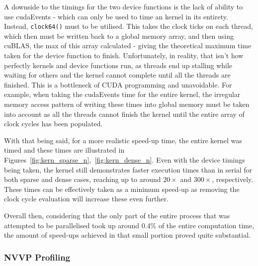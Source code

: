A downside to the timings for the two device functions is the lack of ability to use cudaEvents - which can only be used to time an kernel in its entirety. Instead, \texttt{clock64()} must to be utilised. This takes the clock ticks on each thread, which then must be written back to a global memory array, and then using cuBLAS, the max of this array calculated - giving the theoretical maximum time taken for the device function to finish. Unfortunately, in reality, that isn't how perfectly kernels and device functions run, as threads end up stalling while waiting for others and the kernel cannot complete until all the threads are finished. This is a bottleneck of CUDA programming and unavoidable. For example, when taking the cudaEvents time for the entire kernel, the irregular memory access pattern of writing these times into global memory must be taken into account as all the threads cannot finish the kernel until the entire array of clock cycles has been populated.

With that being said, for a more realistic speed-up time, the entire kernel was timed and these times are illustrated in Figures~\ref{fig:kern_sparse_n},~\ref{fig:kern_dense_n}. Even with the device timings being taken, the kernel still demonstrates faster execution times than in serial for both sparse and dense cases, reaching up to around $20\times$ and $300\times$, respectively. These times can be effectively taken as a minimum speed-up as removing the clock cycle evaluation will increase these even further.

Overall then, considering that the only part of the entire process that was attempted to be parallelised took up around 0.4\% of the entire computation time, the amount of speed-ups achieved in that small portion proved quite substantial.

\subsubsection{NVVP Profiling}

